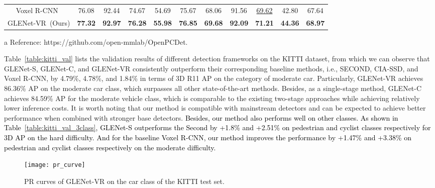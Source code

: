 \documentclass[twocolumn]{svjour3}
\newcommand{\revise}[1]{\textcolor{black}{#1}}
\begin{document}
\begin{table*}[hbp]
\begin{threeparttable}
\begin{tabular}{c|ccccc|ccccc}
			\hline
			Voxel R-CNN~\citep{deng2021voxel}  & 76.08   & 92.44 & 74.67  & 54.69    & 75.67   & 68.06   & 91.56 & \underline{69.62}  & 42.80    & 67.64    \\
			GLENet-VR~(Ours)         & \textbf{77.32}   & \textbf{92.97} & \textbf{76.28}  & \textbf{55.98}    & \textbf{76.85}   & \textbf{69.68}   & \textbf{92.09} & \textbf{71.21}  & \textbf{44.36}    & \textbf{68.97}    \\
			\bottomrule
		\end{tabular}
        \begin{tablenotes}
            \item[a] Reference: https://github.com/open-mmlab/OpenPCDet.
        \end{tablenotes}
        \end{threeparttable}
\end{table*}
\setlength{\tabcolsep}{1.5pt}

Table~\ref{table:kitti_val} lists the validation results of different detection frameworks on the KITTI dataset, from which we can observe that GLENet-S, GLENet-C, and GLENet-VR consistently outperform their corresponding baseline methods, i.e., SECOND, CIA-SSD, and Voxel R-CNN, by 4.79\%, 4.78\%, and 1.84\% in terms of 3D R11 AP on the category of moderate car. Particularly, GLENet-VR achieves 86.36\% AP on the moderate car class, which surpasses all other state-of-the-art methods. Besides, as a single-stage method, GLENet-C achieves 84.59\% AP for the moderate vehicle class, which is comparable to the existing two-stage approaches while achieving relatively lower inference costs. It is worth noting that our method is compatible with mainstream detectors and can be expected to achieve better performance when combined with stronger base detectors.
\revise{Besides, our method also performs well on other classes. As shown in Table~\ref{table:kitti_val_3class}, GLENet-S outperforms the Second by +1.8\% and +2.51\% on pedestrian and cyclist classes respectively for 3D AP on the hard difficulty. And for the baseline Voxel R-CNN, our method improves the performance by +1.47\% and +3.38\% on pedestrian and cyclist classes respectively on the moderate difficulty.}


\begin{figure}[t]
	\centering
	\texttt{[image: pr\_curve]}
	\caption{PR curves of GLENet-VR on the car class of the KITTI test set.
	}
	\label{fig:pr_curve}
\end{figure}
\end{document}
